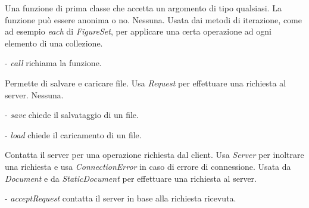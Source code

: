 Una funzione di prima classe che accetta un argomento di tipo qualsiasi. La funzione pu\`o essere anonima o no.
Nessuna.
Usata dai metodi di iterazione, come ad esempio \textit{each} di \textit{FigureSet}, per applicare una certa operazione ad ogni elemento di una collezione.
\begin{elencopuntato}[\normindent]
\item[-] \textit{call} richiama la funzione.
\end{elencopuntato}

Permette di salvare e caricare file.
Usa \textit{Request} per effettuare una richiesta al server.
Nessuna.
\begin{elencopuntato}[\normindent]
\item[-] \textit{save} chiede il salvataggio di un file.
\item[-] \textit{load} chiede il caricamento di un file.
\end{elencopuntato}

Contatta il server per una operazione richiesta dal client.
Usa \textit{Server} per inoltrare una richiesta e usa \textit{ConnectionError} in caso di errore di connessione.
Usata da \textit{Document} e da \textit{StaticDocument} per effettuare una richiesta al server.
\begin{elencopuntato}[\normindent]
\item[-] \textit{acceptRequest} contatta il server in base alla richiesta ricevuta.
\end{elencopuntato}

